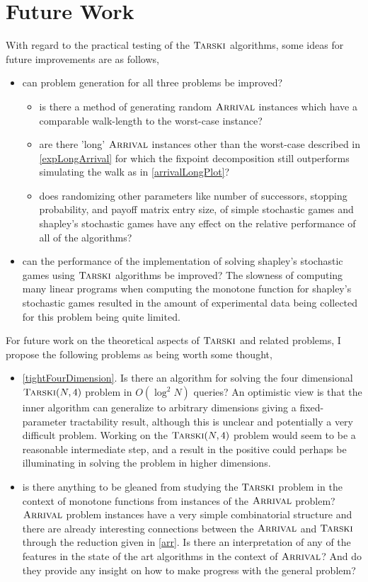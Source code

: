 \section{Future Work}
With regard to the practical testing of the $\textsc{Tarski}$ algorithms, some ideas for future improvements are as follows,
\begin{itemize}
  \item can problem generation for all three problems be improved?
    \begin{itemize}
      \item is there a method of generating random $\textsc{Arrival}$ instances which have a comparable walk-length to the worst-case instance?
      \item are there 'long' $\textsc{Arrival}$ instances other than the worst-case described in \cref{expLongArrival} for which the fixpoint decomposition still
        outperforms simulating the walk as in \cref{arrivalLongPlot}?
      \item does randomizing other parameters like number of successors, stopping probability,
        and payoff matrix entry size, of simple stochastic games and shapley's stochastic games have any effect on
        the relative performance of all of the algorithms?
    \end{itemize}
  \item can the performance of the implementation of solving shapley's stochastic games using $\textsc{Tarski}$ algorithms be improved?
    The slowness of computing many linear programs when computing the monotone function for shapley's stochastic games resulted
    in the amount of experimental data being collected for this problem being quite limited.
\end{itemize}
For future work on the theoretical aspects of $\textsc{Tarski}$ and related problems, I propose the following problems as being worth some thought,
\begin{itemize}
  \item \cref{tightFourDimension}. Is there an algorithm for solving the four dimensional $\textsc{Tarski}(N, 4)$ problem
    in $O(\log^2 N)$ queries? An optimistic view is that the inner algorithm can generalize to arbitrary dimensions
    giving a fixed-parameter tractability result, although this is unclear and potentially a very difficult problem.
    Working on the $\textsc{Tarski}(N, 4)$ problem would seem to be a reasonable intermediate step, and a result in the positive
    could perhaps be illuminating in solving the problem in higher dimensions.
  \item is there anything to be gleaned from studying the $\textsc{Tarski}$ problem in the context of monotone functions from instances of the $\textsc{Arrival}$
    problem? $\textsc{Arrival}$ problem instances have a very simple combinatorial structure and there are already interesting connections between
    the $\textsc{Arrival}$ and $\textsc{Tarski}$ through the reduction given in \cref{arr}. Is there an interpretation of any of the features in the state
    of the art algorithms in the context of $\textsc{Arrival}$? And do they provide any insight on how to make progress with the general problem?
\end{itemize}
